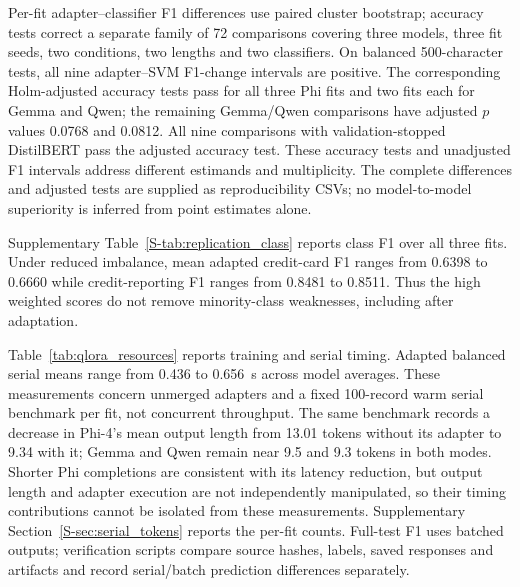 Per-fit adapter--classifier F1 differences use paired cluster bootstrap;
accuracy tests correct a separate family of 72 comparisons covering
three models, three fit seeds, two conditions, two lengths and two classifiers.
On balanced 500-character tests, all nine adapter--SVM F1-change
intervals are positive. The corresponding Holm-adjusted accuracy tests
pass for all three Phi fits and two fits each for Gemma and Qwen;
the remaining Gemma/Qwen comparisons have adjusted $p$ values
0.0768 and 0.0812. All nine comparisons with validation-stopped
DistilBERT pass the adjusted accuracy test. These accuracy tests and
unadjusted F1 intervals address different estimands and multiplicity.
The complete differences and adjusted tests are supplied as reproducibility CSVs;
no model-to-model superiority is inferred from point estimates alone.

Supplementary Table~\ref{S-tab:replication_class} reports class F1
over all three fits. Under reduced imbalance, mean adapted credit-card
F1 ranges from 0.6398 to 0.6660 while credit-reporting F1 ranges
from 0.8481 to 0.8511. Thus the high weighted scores do not remove
minority-class weaknesses, including after adaptation.

Table~\ref{tab:qlora_resources} reports training and serial timing.
Adapted balanced serial means range from 0.436 to
0.656~s across model averages. These measurements concern
unmerged adapters and a fixed 100-record warm serial benchmark per fit,
not concurrent throughput. The same benchmark records a decrease in
Phi-4's mean output length from 13.01 tokens without its adapter to
9.34 with it; Gemma and Qwen remain near 9.5 and 9.3 tokens in both
modes. Shorter Phi completions are consistent with its latency reduction,
but output length and adapter execution are not independently manipulated,
so their timing contributions cannot be isolated from these measurements.
Supplementary Section~\ref{S-sec:serial_tokens} reports the per-fit counts.
Full-test F1 uses batched outputs; verification scripts compare source
hashes, labels, saved responses and artifacts and record serial/batch
prediction differences separately.
